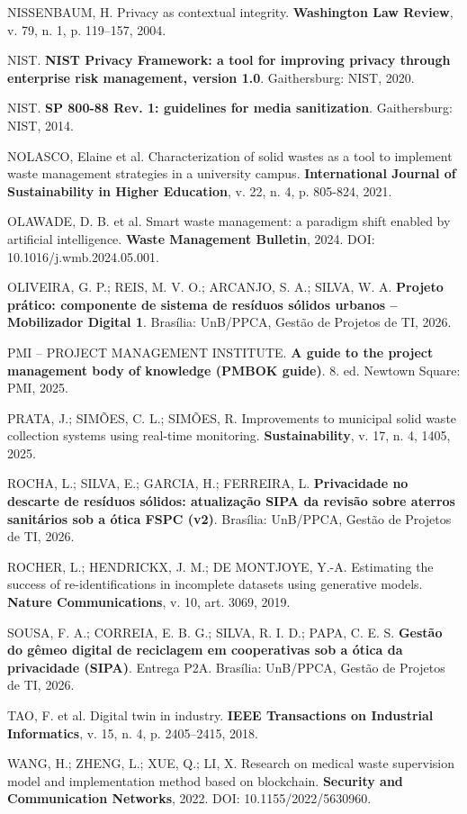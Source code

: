 \documentclass[12pt,a4paper,article,oneside,brazil,english]{abntex2}
\begin{document}
NISSENBAUM, H. Privacy as contextual integrity. \textbf{Washington Law Review}, v. 79, n. 1, p. 119--157, 2004.

NIST. \textbf{NIST Privacy Framework: a tool for improving privacy through enterprise risk management, version 1.0}. Gaithersburg: NIST, 2020.

NIST. \textbf{SP 800-88 Rev. 1: guidelines for media sanitization}. Gaithersburg: NIST, 2014.

NOLASCO, Elaine et al. Characterization of solid wastes as a tool to implement waste management strategies in a university campus. \textbf{International Journal of Sustainability in Higher Education}, v. 22, n. 4, p. 805-824, 2021.

OLAWADE, D. B. et al. Smart waste management: a paradigm shift enabled by artificial intelligence. \textbf{Waste Management Bulletin}, 2024. DOI: 10.1016/j.wmb.2024.05.001.

OLIVEIRA, G. P.; REIS, M. V. O.; ARCANJO, S. A.; SILVA, W. A. \textbf{Projeto prático: componente de sistema de resíduos sólidos urbanos -- Mobilizador Digital 1}. Brasília: UnB/PPCA, Gestão de Projetos de TI, 2026.

PMI -- PROJECT MANAGEMENT INSTITUTE. \textbf{A guide to the project management body of knowledge (PMBOK guide)}. 8. ed. Newtown Square: PMI, 2025.

PRATA, J.; SIMÕES, C. L.; SIMÕES, R. Improvements to municipal solid waste collection systems using real-time monitoring. \textbf{Sustainability}, v. 17, n. 4, 1405, 2025.

ROCHA, L.; SILVA, E.; GARCIA, H.; FERREIRA, L. \textbf{Privacidade no descarte de resíduos sólidos: atualização SIPA da revisão sobre aterros sanitários sob a ótica FSPC (v2)}. Brasília: UnB/PPCA, Gestão de Projetos de TI, 2026.

ROCHER, L.; HENDRICKX, J. M.; DE MONTJOYE, Y.-A. Estimating the success of re-identifications in incomplete datasets using generative models. \textbf{Nature Communications}, v. 10, art. 3069, 2019.

SOUSA, F. A.; CORREIA, E. B. G.; SILVA, R. I. D.; PAPA, C. E. S. \textbf{Gestão do gêmeo digital de reciclagem em cooperativas sob a ótica da privacidade (SIPA)}. Entrega P2A. Brasília: UnB/PPCA, Gestão de Projetos de TI, 2026.

TAO, F. et al. Digital twin in industry. \textbf{IEEE Transactions on Industrial Informatics}, v. 15, n. 4, p. 2405--2415, 2018.

WANG, H.; ZHENG, L.; XUE, Q.; LI, X. Research on medical waste supervision model and implementation method based on blockchain. \textbf{Security and Communication Networks}, 2022. DOI: 10.1155/2022/5630960.

\endgroup
\end{document}
